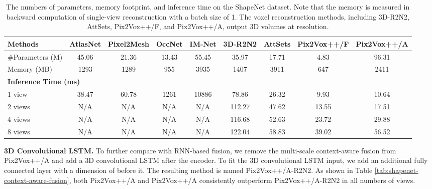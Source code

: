 \documentclass[twocolumn]{svjour3}
\begin{document}
\begin{table*}
  \caption{The numbers of parameters, memory footprint, and inference time on the ShapeNet dataset. Note that the memory is measured in backward computation of single-view reconstruction with a batch size of 1. The voxel reconstruction methods, including 3D-R2N2, AttSets, Pix2Vox++/F, and Pix2Vox++/A, output 3D volumes at  resolution.}
  \centering
  \begin{tabularx}{\linewidth}{l|cccc|cccc}
  \toprule
  Methods               & AtlasNet    & Pixel2Mesh
                        & OccNet      & IM-Net
                        & 3D-R2N2     & AttSets
                        & Pix2Vox++/F & Pix2Vox++/A \\
  \midrule
  \#Parameters (M)      & 45.06       & 21.36
                        & 13.43       & 55.45
                        & 35.97       & 17.71
                        & 4.83        & 96.31 \\
  Memory (MB)           & 1293        & 1289
                        & 955         & 3935
                        & 1407        & 3911
                        & 647         & 2411 \\
  \midrule
  \midrule
  \multicolumn{8}{l}{\bf{Inference Time (ms)}} \\
  \midrule
  1 view                & 38.47       & 60.78
                        & 1261        & 10886
                        & 78.86       & 26.32
                        & 9.93        & 10.64 \\
  2 views               & N/A         & N/A
                        & N/A         & N/A
                        & 112.27      & 47.62 
                        & 13.55       & 17.51 \\
  4 views               & N/A         & N/A
                        & N/A         & N/A
                        & 116.68      & 52.63
                        & 23.72       & 29.88 \\
  8 views               & N/A         & N/A
                        & N/A         & N/A
                        & 122.04      & 58.83
                        & 39.02       & 56.52 \\
  \bottomrule
  \end{tabularx}
  \label{tab:space-time-complexity}
\end{table*}

\noindent \textbf{3D Convolutional LSTM.}
To further compare with RNN-based fusion, we remove the multi-scale context-aware fusion from Pix2Vox++/A and add a 3D convolutional LSTM \citep{DBLP:conf/eccv/ChoyXGCS16} after the encoder.
To fit the 3D convolutional LSTM input, we add an additional fully connected layer with a dimension of  before it.
The resulting method is named Pix2Vox++/A-R2N2.
As shown in Table \ref{tab:shapenet-context-aware-fusion}, both Pix2Vox++/A and Pix2Vox++/A consistently outperform Pix2Vox++/A-R2N2 in all numbers of views. 
\end{document}
